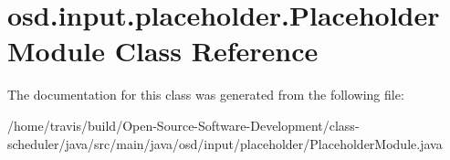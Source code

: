 \hypertarget{classosd_1_1input_1_1placeholder_1_1_placeholder_module}{\section{osd.\-input.\-placeholder.\-Placeholder\-Module Class Reference}
\label{classosd_1_1input_1_1placeholder_1_1_placeholder_module}
}


The documentation for this class was generated from the following file\-:\begin{DoxyCompactItemize}
\item 
/home/travis/build/\-Open-\/\-Source-\/\-Software-\/\-Development/class-\/scheduler/java/src/main/java/osd/input/placeholder/Placeholder\-Module.\-java\end{DoxyCompactItemize}
